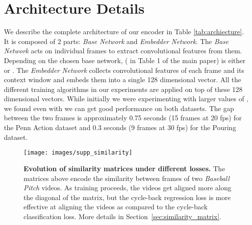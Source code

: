 \documentclass[10pt,twocolumn,letterpaper]{article}
\begin{document}
\section{Architecture Details}
We describe the complete architecture of our encoder  in Table \ref{tab:archiecture}. It is composed of 2 parts: \textit{Base Network} and \textit{Embedder Network}. The \textit{Base Network} acts on individual frames to extract convolutional features from them. Depending on the chosen base network,  ( in Table 1 of the main paper) is either  or . The \textit{Embedder Network} collects convolutional features of each frame and its context window and embeds them into a single 128 dimensional vector. All the different training algorithms in our experiments are applied on top of these 128 dimensional vectors. While initially we were experimenting with larger values of , we found even with  we can get good performance on both datasets. The gap between the two frames is approximately 0.75 seconds (15 frames at 20 fps) for the Penn Action dataset and 0.3 seconds (9 frames at 30 fps) for the Pouring dataset. 

\begin{figure*}
    \centering
    \texttt{[image: images/supp\_similarity]}
    \caption{\textbf{Evolution of similarity matrices under different losses.} The matrices above encode the similarity  between frames of two \textit{Baseball Pitch} videos. As training proceeds, the videos get aligned more along the diagonal of the matrix, but the cycle-back regression loss is more effective at aligning the videos as compared to the cycle-back classification loss. More details in Section~\ref{sec:similarity_matrix}.}
    \label{fig:supp_similarity} 
\end{figure*}
\end{document}
